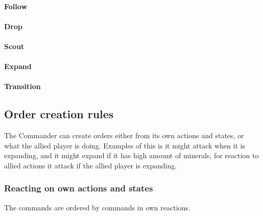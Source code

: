 \paragraph{Follow}

\paragraph{Drop}

\paragraph{Scout}

\paragraph{Expand}

\paragraph{Transition}

\subsection{Order creation rules}
The Commander can create orders either from its own actions and states, or what the allied player is doing. Examples of this is it might attack when it is expanding, and it might expand if it has high amount of minerals, for reaction to allied actions it attack if the allied player is expanding.

\subsubsection{Reacting on own actions and states}
The commands are ordered by commands in own reactions.

